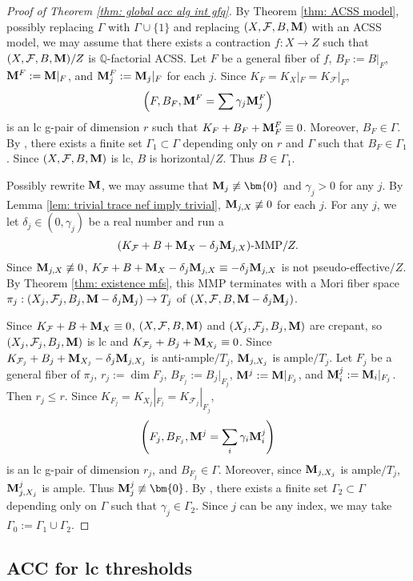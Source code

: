 \documentclass[11pt]{amsart}
\numberwithin{equation}{section}
\newcommand{\Mm}{{\bf{M}}}
\newcommand{\Qq}{\mathbb{Q}}
\newcommand{\Ff}{\mathcal{F}}
\newcommand{\Ii}{\Gamma}
\theoremstyle{definition}
\theoremstyle{definition}
\theoremstyle{definition}
\begin{document}
\begin{proof}[Proof of Theorem \ref{thm: global acc alg int gfq}]
 By Theorem \ref{thm:  ACSS model}, possibly replacing $\Ii$ with $\Ii\cup\{1\}$ and replacing $(X,\Ff,B,\Mm)$ with an ACSS model, we may assume that there exists a contraction $f: X\rightarrow Z$ such that $(X,\Ff,B,\Mm)/Z$ is $\Qq$-factorial ACSS. Let $F$ be a general fiber of $f$, $B_F:=B|_F$, $\Mm^F:=\Mm|_F$, and $\Mm^F_j:=\Mm_j|_F$ for each $j$. Since $K_F=K_X|_F=K_{\Ff}|_F$,
$$\left(F,B_F,\Mm^F=\sum\gamma_j\Mm_j^F\right)$$
    is an lc g-pair of dimension $r$ such that $K_F+B_F+\Mm^F_F\equiv 0$. Moreover, $B_F\in\Ii$. By \cite[Theorem 1.6]{BZ16}, there exists a finite set $\Ii_1\subset\Ii$ depending only on $r$ and $\Ii$ such that $B_F\in\Ii_1$. Since $(X,\Ff,B,\Mm)$ is lc, $B$ is horizontal$/Z$. Thus $B\in\Ii_1$.

    Possibly rewrite $\Mm$, we may assume that $\Mm_j\not\equiv\bm{0}$ and $\gamma_j>0$ for any $j$. By Lemma \ref{lem: trivial trace nef imply trivial}, $\Mm_{j,X}\not\equiv 0$ for each $j$. For any $j$, we let $\delta_j\in (0,\gamma_j)$ be a real number and run a 
    $$(K_{\Ff}+B+\Mm_X-\delta_j\Mm_{j,X})\text{-MMP}/Z.$$
    Since $\Mm_{j,X}\not\equiv 0$, $K_{\Ff}+B+\Mm_X-\delta_j\Mm_{j,X}\equiv -\delta_j\Mm_{j,X}$ is not pseudo-effective$/Z$. By Theorem \ref{thm: existence mfs}, this MMP terminates with a Mori fiber space $\pi_j: (X_j,\Ff_j,B_j,\Mm-\delta_j\Mm_j)\rightarrow T_j$ of $(X,\Ff,B,\Mm-\delta_j\Mm_j)$.
    
    Since $K_{\Ff}+B+\Mm_X\equiv 0$, $(X,\Ff,B,\Mm)$ and $(X_j,\Ff_j,B_j,\Mm)$ are crepant, so $(X_j,\Ff_j,B_j,\Mm)$ is lc and $K_{\Ff_j}+B_j+\Mm_{X_j}\equiv 0$. Since $K_{\Ff_j}+B_j+\Mm_{X_j}-\delta_j\Mm_{j,X_j}$ is anti-ample$/T_j$, $\Mm_{j,X_j}$ is ample$/T_j$.
    Let $F_j$ be a general fiber of $\pi_j$, $r_j:=\dim F_j$, $B_{F_j}:=B_j|_{F_j}$, $\Mm^j:=\Mm|_{F_j}$, and $\Mm^j_i:=\Mm_i|_{F_j}$. Then $r_j\leq r$. Since $K_{F_j}=K_{X_j}|_{F_j}=K_{\Ff_j}|_{F_j}$,
    $$\left(F_j,B_{F_j},\Mm^j=\sum_i\gamma_i\Mm^j_i\right)$$
    is an lc g-pair of dimension $r_j$, and $B_{F_j}\in\Ii$. Moreover, since $\Mm_{j,X_j}$ is ample$/T_j$, $\Mm^j_{j,X_j}$ is ample. Thus $\Mm^j_j\not\equiv\bm{0}$. By \cite[Theorem 1.6]{BZ16}, there exists a finite set $\Ii_2\subset\Ii$ depending only on $\Ii$ such that $\gamma_j\in\Ii_2$. Since $j$ can be any index, we may take $\Ii_0:=\Ii_1\cup\Ii_2$.
\end{proof}


\subsection{ACC for lc thresholds}\label{subsec: acc}
\end{document}
